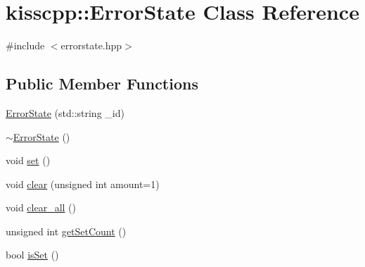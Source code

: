 \hypertarget{classkisscpp_1_1_error_state}{\section{kisscpp\-:\-:Error\-State Class Reference}
\label{classkisscpp_1_1_error_state}
}


{\ttfamily \#include $<$errorstate.\-hpp$>$}

\subsection*{Public Member Functions}
\begin{DoxyCompactItemize}
\item 
\hyperlink{classkisscpp_1_1_error_state_ad51f90a7606a12bc2d9053151441d343}{Error\-State} (std\-::string \-\_\-id)
\item 
\hyperlink{classkisscpp_1_1_error_state_a75f55fa61878bb008abd861012b88662}{$\sim$\-Error\-State} ()
\item 
void \hyperlink{classkisscpp_1_1_error_state_adba9283ecd7976c57ef48d438da86778}{set} ()
\item 
void \hyperlink{classkisscpp_1_1_error_state_af46a0feee156aca2e7aae7695b0febcf}{clear} (unsigned int amount=1)
\item 
void \hyperlink{classkisscpp_1_1_error_state_aa9da790733f2f6963a5b6ca1167d137b}{clear\-\_\-all} ()
\item 
unsigned int \hyperlink{classkisscpp_1_1_error_state_a211a4d0740010a7aa7c78b8514bc6969}{get\-Set\-Count} ()
\item 
bool \hyperlink{classkisscpp_1_1_error_state_a79c9043eb6c04a10e7c4b86888697ce8}{is\-Set} ()
\end{DoxyCompactItemize}


